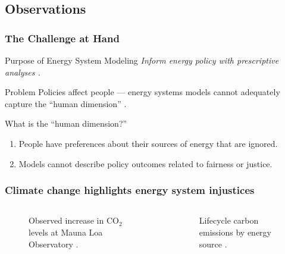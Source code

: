 \subsection{Observations}

\begin{frame}
    \frametitle{The Challenge at Hand}

    \begin{block}{Purpose of Energy System Modeling}
        \textit{Inform energy policy with prescriptive analyses \cite{decarolis_using_2011}.}
    \end{block}
    \begin{block}{Problem}
        Policies affect people --- energy systems models cannot adequately capture the ``human dimension''
        \cite{pfenninger_energy_2014}.
    \end{block}
    \begin{block}{What is the ``human dimension?''}
        \begin{enumerate}
            \item People have preferences about their sources of energy that are ignored.
            \item Models cannot describe policy outcomes related to fairness or justice.
        \end{enumerate}
    \end{block}
\end{frame}

\begin{frame}
    \frametitle{Climate change highlights energy system injustices}

    \begin{columns}
        \column[t]{5cm}
        \begin{figure}
            \centering
            \resizebox{\columnwidth}{!}{}            
            \caption{Observed increase in CO$_2$ levels at Mauna Loa Observatory
            \cite{kane_atmospheric_1996}.}
            \label{figure:mauna-loa}
        \end{figure}
        
        \column[t]{5cm}
        \begin{figure}
            \centering
            \resizebox{0.75\columnwidth}{!}{}
            \caption{Lifecycle carbon emissions by energy source
            \cite{united_nations_economic_commission_for_europe_carbon_2022}.}
            \label{figure:energy-emissions}
        \end{figure}
    \end{columns}

\end{frame}

